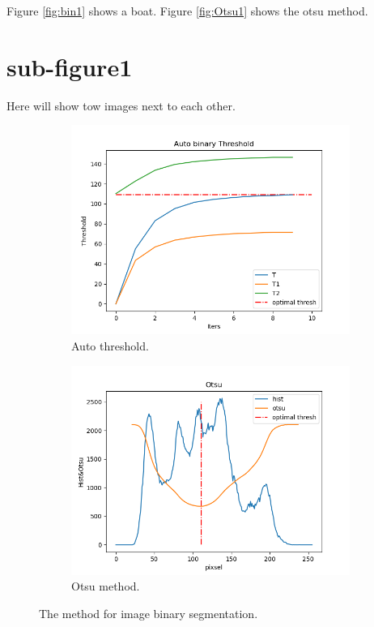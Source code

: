 \documentclass{article}
\begin{document}
Figure \ref{fig:bin1} shows a boat. 
Figure \ref{fig:Otsu1} shows the otsu method.

\section{sub-figure1}
Here will show tow images next to each other.

\begin{figure}[h!]
  \centering
  \begin{subfigure}[b]{0.45\linewidth}
    \includegraphics[width=\linewidth]{autoThres.png}
    \caption{Auto threshold.}
  \end{subfigure}
  \begin{subfigure}[b]{0.45\linewidth}
    \includegraphics[width=\linewidth]{otsu.png}
    \caption{Otsu method.}
  \end{subfigure}
  \caption{The method for image binary segmentation.}
  \label{fig:imageSeg}
\end{figure}
\end{document}
